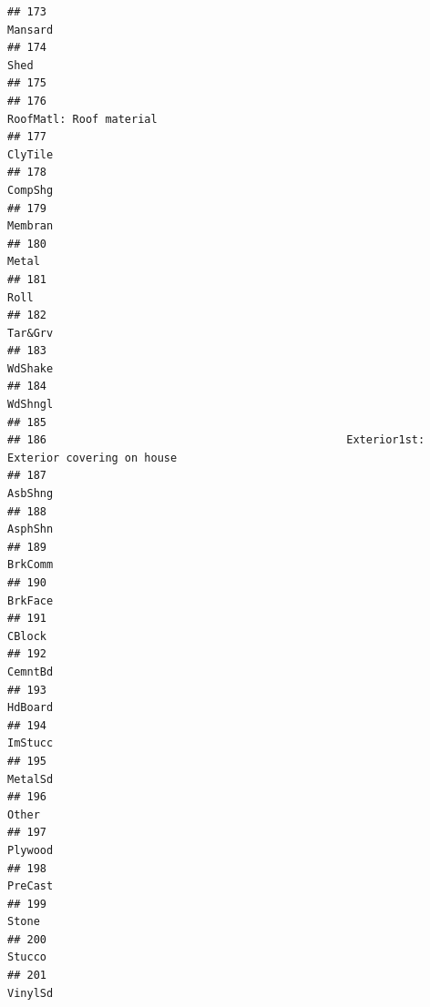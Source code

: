 \documentclass[
]{article}
\begin{document}
\begin{verbatim}
## 173                                                                              Mansard
## 174                                                                                 Shed
## 175                                                                                     
## 176                                                              RoofMatl: Roof material
## 177                                                                              ClyTile
## 178                                                                              CompShg
## 179                                                                              Membran
## 180                                                                                Metal
## 181                                                                                 Roll
## 182                                                                              Tar&Grv
## 183                                                                              WdShake
## 184                                                                              WdShngl
## 185                                                                                     
## 186                                              Exterior1st: Exterior covering on house
## 187                                                                              AsbShng
## 188                                                                              AsphShn
## 189                                                                              BrkComm
## 190                                                                              BrkFace
## 191                                                                               CBlock
## 192                                                                              CemntBd
## 193                                                                              HdBoard
## 194                                                                              ImStucc
## 195                                                                              MetalSd
## 196                                                                                Other
## 197                                                                              Plywood
## 198                                                                              PreCast
## 199                                                                                Stone
## 200                                                                               Stucco
## 201                                                                              VinylSd

\end{verbatim}
\end{document}
